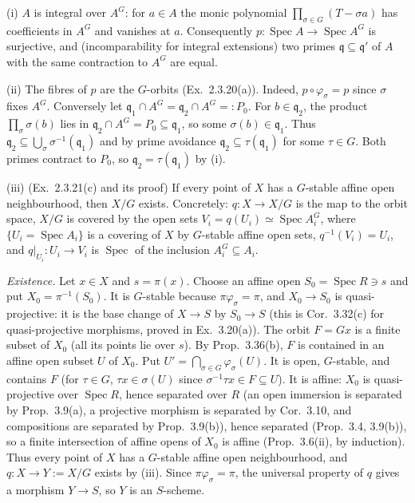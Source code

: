 \documentclass[11pt]{article}
\begin{document}
(i) $A$ is integral over $A^G$: for $a\in A$ the monic polynomial $\prod_{\sigma\in G}(T-\sigma a)$ has coefficients in $A^G$ and vanishes at $a$. Consequently $p:\operatorname{Spec}A\to\operatorname{Spec}A^G$ is surjective, and (incomparability for integral extensions) two primes $\mathfrak q\subseteq\mathfrak q'$ of $A$ with the same contraction to $A^G$ are equal.

(ii) The fibres of $p$ are the $G$-orbits (Ex.~2.3.20(a)). Indeed, $p\circ\varphi_\sigma=p$ since $\sigma$ fixes $A^G$. Conversely let $\mathfrak q_1\cap A^G=\mathfrak q_2\cap A^G=:P_0$. For $b\in\mathfrak q_2$, the product $\prod_\sigma\sigma(b)$ lies in $\mathfrak q_2\cap A^G=P_0\subseteq\mathfrak q_1$, so some $\sigma(b)\in\mathfrak q_1$. Thus $\mathfrak q_2\subseteq\bigcup_{\sigma}\sigma^{-1}(\mathfrak q_1)$ and by prime avoidance $\mathfrak q_2\subseteq\tau(\mathfrak q_1)$ for some $\tau\in G$. Both primes contract to $P_0$, so $\mathfrak q_2=\tau(\mathfrak q_1)$ by (i).

(iii) (Ex.~2.3.21(c) and its proof) If every point of $X$ has a $G$-stable affine open neighbourhood, then $X/G$ exists. Concretely: $q:X\to X/G$ is the map to the orbit space, $X/G$ is covered by the open sets $V_i=q(U_i)\simeq\operatorname{Spec}A_i^G$, where $\{U_i=\operatorname{Spec}A_i\}$ is a covering of $X$ by $G$-stable affine open sets, $q^{-1}(V_i)=U_i$, and $q|_{U_i}:U_i\to V_i$ is $\operatorname{Spec}$ of the inclusion $A_i^G\subseteq A_i$.

\emph{Existence.} Let $x\in X$ and $s=\pi(x)$. Choose an affine open $S_0=\operatorname{Spec}R\ni s$ and put $X_0=\pi^{-1}(S_0)$. It is $G$-stable because $\pi\varphi_\sigma=\pi$, and $X_0\to S_0$ is quasi-projective: it is the base change of $X\to S$ by $S_0\to S$ (this is Cor.~3.32(c) for quasi-projective morphisms, proved in Ex.~3.20(a)). The orbit $F=Gx$ is a finite subset of $X_0$ (all its points lie over $s$). By Prop.~3.36(b), $F$ is contained in an affine open subset $U$ of $X_0$. Put $U'=\bigcap_{\sigma\in G}\varphi_\sigma(U)$. It is open, $G$-stable, and contains $F$ (for $\tau\in G$, $\tau x\in\sigma(U)$ since $\sigma^{-1}\tau x\in F\subseteq U$). It is affine: $X_0$ is quasi-projective over $\operatorname{Spec}R$, hence separated over $R$ (an open immersion is separated by Prop.~3.9(a), a projective morphism is separated by Cor.~3.10, and compositions are separated by Prop.~3.9(b)), hence separated (Prop.~3.4, 3.9(b)), so a finite intersection of affine opens of $X_0$ is affine (Prop.~3.6(ii), by induction). Thus every point of $X$ has a $G$-stable affine open neighbourhood, and $q:X\to Y:=X/G$ exists by (iii). Since $\pi\varphi_\sigma=\pi$, the universal property of $q$ gives a morphism $Y\to S$, so $Y$ is an $S$-scheme.
\end{document}
